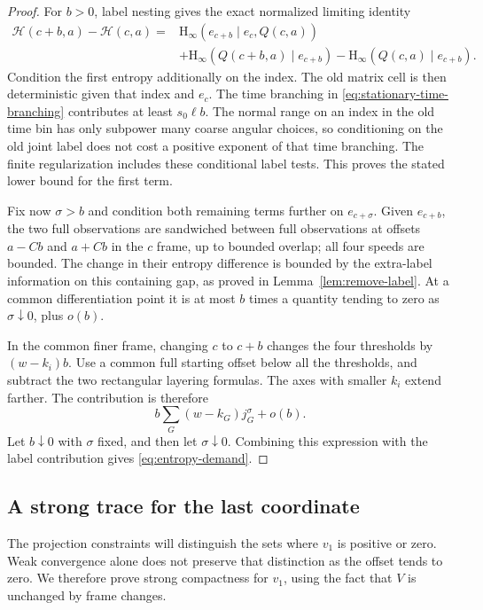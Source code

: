 \begin{proof}
For $b>0$, label nesting gives the exact normalized limiting identity
\begin{align}
 \mathscr H(c+b,a)-\mathscr H(c,a)
 ={}&\mathrm H_\infty(e_{c+b}\mid e_c,Q(c,a))\nonumber\\
 &+\mathrm H_\infty(Q(c+b,a)\mid e_{c+b})
       -\mathrm H_\infty(Q(c,a)\mid e_{c+b}).
 \label{eq:entropy-demand-chain}
\end{align}
Condition the first entropy additionally on the index.  The old
matrix cell is then deterministic given that index and $e_c$.
The time branching in \eqref{eq:stationary-time-branching} contributes
at least $s_0\ell b$.  The normal range on an index in the old time
bin has only subpower many coarse angular choices, so conditioning on
the old joint label does not cost a positive exponent of that time
branching.  The finite regularization includes these conditional label
tests.  This proves the stated lower bound for the first term.

Fix now $\sigma>b$ and condition both remaining terms further on
$e_{c+\sigma}$.  Given $e_{c+b}$, the two full observations are
sandwiched between full observations at offsets $a-Cb$ and $a+Cb$
in the $c$ frame, up to bounded overlap; all four speeds are bounded.
The change in their entropy difference is bounded by the extra-label
information on this containing gap, as proved in
Lemma~\ref{lem:remove-label}.  At a common differentiation point it
is at most $b$ times a quantity tending to zero as $\sigma\downarrow0$,
plus $o(b)$.

In the common finer frame, changing $c$ to $c+b$ changes the four
thresholds by $(w-k_i)b$.  Use a common full starting offset below
all the thresholds, and subtract the two rectangular layering
formulas.  The axes with smaller $k_i$ extend farther.  The contribution
is therefore
\[
 b\sum_G(w-k_G)j_G^\sigma+o(b).
\]
Let $b\downarrow0$ with $\sigma$ fixed, and then let
$\sigma\downarrow0$.  Combining this expression with the label
contribution gives \eqref{eq:entropy-demand}.
\end{proof}

\subsection{A strong trace for the last coordinate}

The projection constraints will distinguish the sets where $v_1$ is
positive or zero.  Weak convergence alone does not preserve that
distinction as the offset tends to zero.  We therefore prove strong
compactness for $v_1$, using the fact that $V$ is unchanged by frame
changes.

